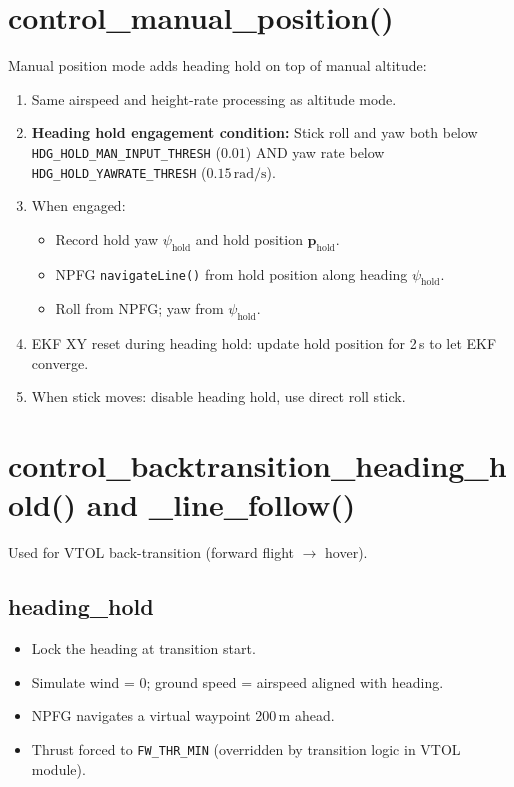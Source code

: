 \documentclass[12pt,a4paper]{article}
\begin{document}
\section{control\_manual\_position()}

Manual position mode adds heading hold on top of manual altitude:

\begin{enumerate}
  \item Same airspeed and height-rate processing as altitude mode.
  \item \textbf{Heading hold engagement condition:}
        Stick roll and yaw both below \texttt{HDG\_HOLD\_MAN\_INPUT\_THRESH}
        ($0.01$) AND yaw rate below \texttt{HDG\_HOLD\_YAWRATE\_THRESH}
        ($0.15\,\text{rad/s}$).
  \item When engaged:
        \begin{itemize}
          \item Record hold yaw $\psi_{\text{hold}}$ and hold position
                $\mathbf{p}_{\text{hold}}$.
          \item NPFG \texttt{navigateLine()} from hold position along
                heading $\psi_{\text{hold}}$.
          \item Roll from NPFG; yaw from $\psi_{\text{hold}}$.
        \end{itemize}
  \item EKF XY reset during heading hold: update hold position for 2\,s
        to let EKF converge.
  \item When stick moves: disable heading hold, use direct roll stick.
\end{enumerate}

\section{control\_backtransition\_heading\_hold() and \_line\_follow()}

Used for VTOL back-transition (forward flight $\to$ hover).

\subsection{heading\_hold}
\begin{itemize}
  \item Lock the heading at transition start.
  \item Simulate wind = 0; ground speed = airspeed aligned with heading.
  \item NPFG navigates a virtual waypoint 200\,m ahead.
  \item Thrust forced to \texttt{FW\_THR\_MIN} (overridden by transition
        logic in VTOL module).
\end{itemize}
\end{document}
